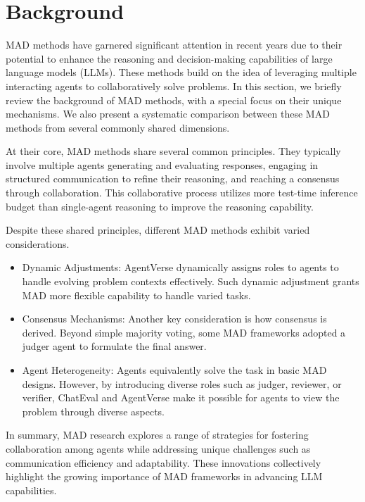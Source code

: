 \section{Background}

MAD methods have garnered significant attention in recent years due to their potential to enhance the reasoning and decision-making capabilities of large language models (LLMs). These methods build on the idea of leveraging multiple interacting agents to collaboratively solve problems. In this section, we briefly review the background of MAD methods, with a special focus on their unique mechanisms. We also present a systematic comparison between these MAD methods from several commonly shared dimensions. 

At their core, MAD methods share several common principles. They typically involve multiple agents generating and evaluating responses, engaging in structured communication to refine their reasoning, and reaching a consensus through collaboration. This collaborative process utilizes more test-time inference budget than single-agent reasoning to improve the reasoning capability.

Despite these shared principles, different MAD methods exhibit varied considerations. 

\begin{itemize}
    \item Dynamic Adjustments: AgentVerse\cite{chen2023agentverse} dynamically assigns roles to agents to handle evolving problem contexts effectively. Such dynamic adjustment grants MAD more flexible capability to handle varied tasks.

    \item Consensus Mechanisms: Another key consideration is how consensus is derived. Beyond simple majority voting\cite{duimproving}, some MAD frameworks\cite{liang2023encouraging} adopted a judger agent to formulate the final answer.

    \item Agent Heterogeneity: Agents equivalently solve the task in basic MAD designs\cite{yin2023exchange, duimproving}. However, by introducing diverse roles such as judger, reviewer, or verifier, ChatEval\cite{chanchateval} and AgentVerse\cite{chen2023agentverse} make it possible for agents to view the problem through diverse aspects. 
\end{itemize}

In summary, MAD research explores a range of strategies for fostering collaboration among agents while addressing unique challenges such as communication efficiency and adaptability. These innovations collectively highlight the growing importance of MAD frameworks in advancing LLM capabilities. 


